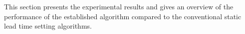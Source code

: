 \documentclass[envcountsame]{llncs}
\newcommand\MS[2][r]{\ifx t#1 \textcolor{blue}{[\textbf{MS:} #2]}
  \else \begin{center}\textcolor{blue}{\textbf{MS:} #2} \end{center} \fi}
\begin{document}
This section presents the experimental results and gives an overview of the performance of the
established algorithm compared to the conventional static lead time setting algorithms.

\end{document}
